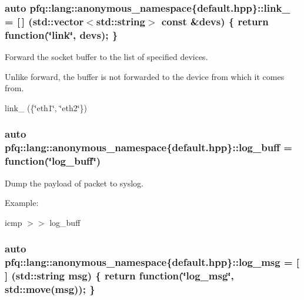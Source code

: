 \subsubsection[{\texorpdfstring{link\+\_\+}{link_}}]{\setlength{\rightskip}{0pt plus 5cm}auto pfq\+::lang\+::anonymous\+\_\+namespace\{default.\+hpp\}\+::link\+\_\+ = \mbox{[}$\,$\mbox{]} (std\+::vector$<$std\+::string$>$ const \&devs) \{ return {\bf function}(\char`\"{}link\char`\"{}, devs); \}}\hypertarget{namespacepfq_1_1lang_1_1anonymous__namespace_02default_8hpp_03_aaad98f847b8e4c53a5ddec3c93b05296}{}\label{namespacepfq_1_1lang_1_1anonymous__namespace_02default_8hpp_03_aaad98f847b8e4c53a5ddec3c93b05296}


Forward the socket buffer to the list of specified devices. 

Unlike forward, the buffer is not forwarded to the device from which it comes from.

link\+\_\+ (\{\char`\"{}eth1\char`\"{}, \char`\"{}eth2\char`\"{}\}) 
\subsubsection[{\texorpdfstring{log\+\_\+buff}{log_buff}}]{\setlength{\rightskip}{0pt plus 5cm}auto pfq\+::lang\+::anonymous\+\_\+namespace\{default.\+hpp\}\+::log\+\_\+buff = {\bf function}(\char`\"{}log\+\_\+buff\char`\"{})}\hypertarget{namespacepfq_1_1lang_1_1anonymous__namespace_02default_8hpp_03_ac16d4c4b496e6e882901d84ded462101}{}\label{namespacepfq_1_1lang_1_1anonymous__namespace_02default_8hpp_03_ac16d4c4b496e6e882901d84ded462101}


Dump the payload of packet to syslog. 

Example\+:

icmp $>$$>$ log\+\_\+buff 
\subsubsection[{\texorpdfstring{log\+\_\+msg}{log_msg}}]{\setlength{\rightskip}{0pt plus 5cm}auto pfq\+::lang\+::anonymous\+\_\+namespace\{default.\+hpp\}\+::log\+\_\+msg = \mbox{[}$\,$\mbox{]} (std\+::string msg) \{ return {\bf function}(\char`\"{}log\+\_\+msg\char`\"{}, std\+::move(msg)); \}}\hypertarget{namespacepfq_1_1lang_1_1anonymous__namespace_02default_8hpp_03_a82e76226844f043aac9a2dd01615c9bb}{}\label{namespacepfq_1_1lang_1_1anonymous__namespace_02default_8hpp_03_a82e76226844f043aac9a2dd01615c9bb}



